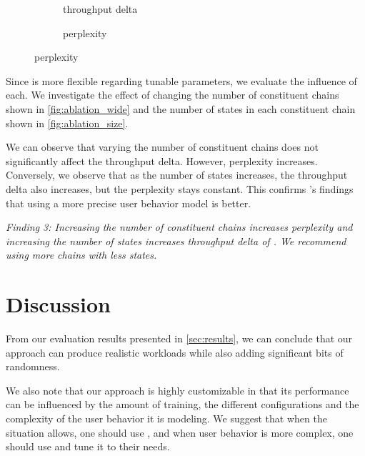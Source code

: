 \begin{figure}
    \caption{Performance of \worklogbeta{} versus number of states of each constituent chain.}\label{fig:ablation_size}
    \centering
    \begin{subfigure}{.5\columnwidth}
        \caption{throughput delta}
        \centering
        \resizebox{\textwidth}{!}{}
    \end{subfigure}%
    \begin{subfigure}{.5\columnwidth}
        \caption{perplexity}
        \centering
        \resizebox{0.97\textwidth}{!}{}
    \end{subfigure}
\end{figure}

Since \worklogbeta{} is more flexible regarding tunable parameters, we evaluate the influence of each. We investigate the effect of changing the number of constituent chains shown in \cref{fig:ablation_wide} and the number of states in each constituent chain shown in \cref{fig:ablation_size}.

We can observe that varying the number of constituent chains does not significantly affect the throughput delta. However, perplexity increases. Conversely, we observe that as the number of states increases, the throughput delta also increases, but the perplexity stays constant. This confirms \cite{Cohen2005-mn}'s findings that using a more precise user behavior model is better.

\emph{Finding 3: Increasing the number of constituent chains increases perplexity and increasing the number of states increases throughput delta of \worklogbeta{}. We recommend using more chains with less states.}

\section{Discussion}\label{sec:discussion}

From our evaluation results presented in \cref{sec:results}, we can conclude that our approach can produce realistic workloads while also adding significant bits of randomness.

We also note that our approach is highly customizable in that its performance can be influenced by the amount of training, the different configurations and the complexity of the user behavior it is modeling. We suggest that when the situation allows, one should use \worklogalpha{}, and when user behavior is more complex, one should use \worklogbeta{} and tune it to their needs.

